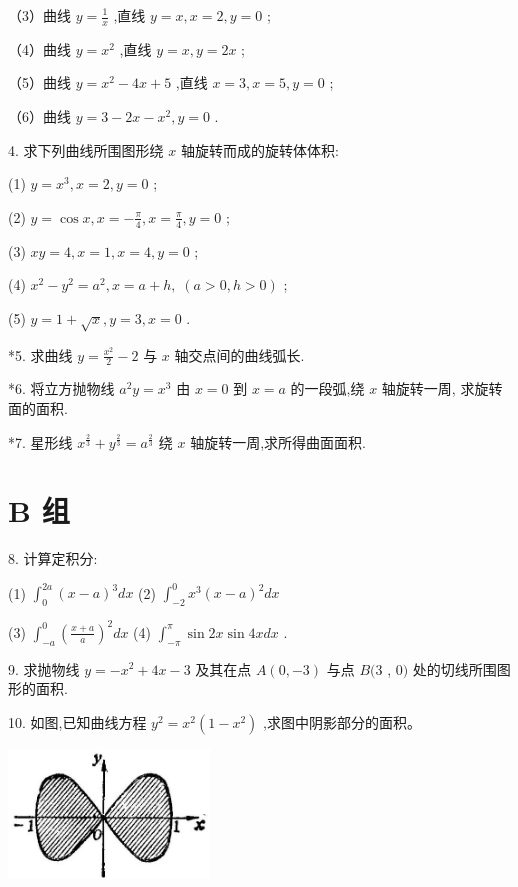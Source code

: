 \documentclass[lang=cn,newtx,10pt,scheme=chinese]{elegantbook}
\begin{document}
（3）曲线 \(y = \frac{1}{x}\) ,直线 \(y = x,x = 2,y = 0\) ;

（4）曲线 \(y = {x}^{2}\) ,直线 \(y = x,y = {2x}\) ;

（5）曲线 \(y = {x}^{2} - {4x} + 5\) ,直线 \(x = 3,x = 5,y = 0\) ;

（6）曲线 \(y = 3 - {2x} - {x}^{2},y = 0\) .

4. 求下列曲线所围图形绕 \(x\) 轴旋转而成的旋转体体积:

(1) \(y = {x}^{3},x = 2,y = 0\) ;

(2) \(y = \cos x,x = - \frac{\pi }{4},x = \frac{\pi }{4},y = 0\) ;

(3) \({xy} = 4,x = 1,x = 4,y = 0\) ;

(4) \({x}^{2} - {y}^{2} = {a}^{2},x = a + h,\;\left( {a > 0,h > 0}\right)\) ;

(5) \(y = 1 + \sqrt{x},y = 3,x = 0\) .

*5. 求曲线 \(y = \frac{{x}^{2}}{2} - 2\) 与 \(x\) 轴交点间的曲线弧长.

*6. 将立方抛物线 \({a}^{2}y = {x}^{3}\) 由 \(x = 0\) 到 \(x = a\) 的一段弧,绕 \(x\) 轴旋转一周, 求旋转面的面积.

*7. 星形线 \({x}^{\frac{2}{3}} + {y}^{\frac{2}{3}} = {a}^{\frac{2}{3}}\) 绕 \(x\) 轴旋转一周,求所得曲面面积.

\section*{B 组}

8. 计算定积分:

(1) \({\int }_{0}^{2a}{\left( x - a\right) }^{3}{dx}\) (2) \({\int }_{-2}^{0}{x}^{3}{\left( x - a\right) }^{2}{dx}\)

(3) \({\int }_{-a}^{0}{\left( \frac{x + a}{a}\right) }^{2}{dx}\) (4) \({\int }_{-\pi }^{\pi }\sin {2x}\sin {4xdx}\) .

9. 求抛物线 \(y = - {x}^{2} + {4x} - 3\) 及其在点 \(A\left( {0, - 3}\right)\) 与点 \(B(3\) , \(0)\) 处的切线所围图形的面积.

10. 如图,已知曲线方程 \({y}^{2} = {x}^{2}\left( {1 - {x}^{2}}\right)\) ,求图中阴影部分的面积。

\begin{center}
\includegraphics[max width=0.4\textwidth]{images/01912c18-5c3f-733d-b775-749ba9897a9d_253_827563.jpg}
\end{center}
\end{document}
